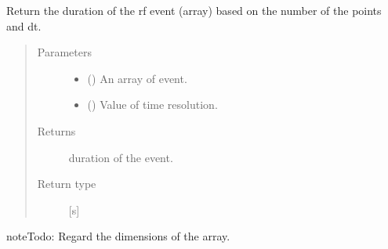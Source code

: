 \documentclass[a4paper,10pt,english]{sphinxmanual}
\begin{document}
\begin{fulllineitems}
\label{\detokenize{autodoc/mrsprint/mrsprint.system:mrsprint.system.rf.rf_duration}}
Return the duration of the rf event (array) based on the number of the points and  dt.
\begin{quote}\begin{description}
\item[{Parameters}] \leavevmode\begin{itemize}
\item {} 
 () \textendash{} An array of event.

\item {} 
 (\sphinxstyleliteralemphasis{\sphinxupquote{ {[}}}\sphinxstyleliteralemphasis{\sphinxupquote{{]}}}) \textendash{} Value of time resolution.

\end{itemize}

\item[{Returns}] \leavevmode
duration of the event.

\item[{Return type}] \leavevmode
{} {[}s{]}

\end{description}\end{quote}

\begin{sphinxadmonition}{note}{\label{autodoc/mrsprint/mrsprint.system:index-3}Todo:}
Regard the dimensions of the array.
\end{sphinxadmonition}

\end{fulllineitems}

\end{document}
